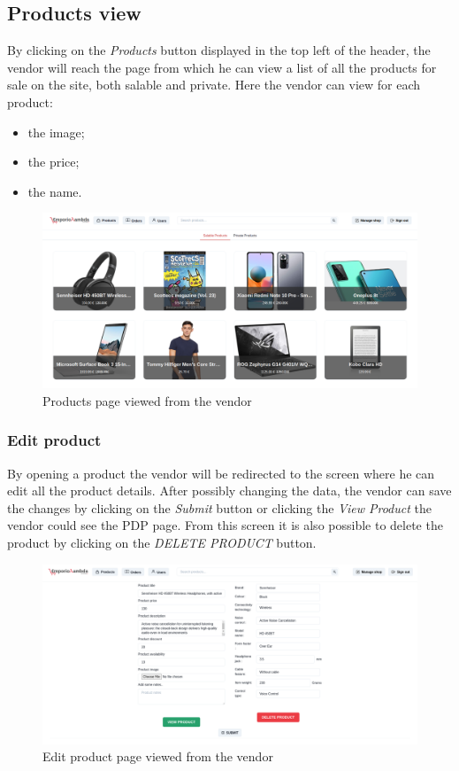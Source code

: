 \subsection{Products view}
By clicking on the \textit{Products} button displayed in the top left of the header, the vendor will reach the page from which he can view a list of all the products for sale on the site, both salable and private.
Here the vendor can view for each product:
\begin{itemize}
    \item the image;
    \item the price;
    \item the name.
\end{itemize}
\begin{figure}[!ht]
    \caption{Products page viewed from the vendor}
    \vspace{5px}
    \includegraphics[scale=0.25]{../../../../Images/userManual/productsVendor.png}
    \centering
\end{figure}
\pagebreak
\subsubsection{Edit product}
By opening a product the vendor will be redirected to the screen where he can edit all the product details. After possibly changing the data, the vendor can save the changes by clicking on the \textit{Submit} button or clicking the \textit{View Product} the vendor could see the PDP page. From this screen it is also possible to delete the product by clicking on the \textit{DELETE PRODUCT} button.
\begin{figure}[!ht]
    \caption{Edit product page viewed from the vendor}
    \vspace{5px}
    \includegraphics[scale=0.25]{../../../../Images/userManual/editProductVendor.png}
    \centering
\end{figure}
\pagebreak
